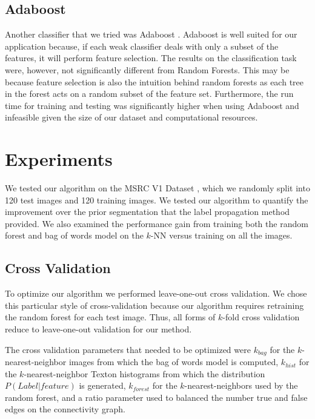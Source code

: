 \documentclass{article} %
\begin{document}
\subsection{Adaboost}
Another classifier that we tried was Adaboost \cite{Freund96experimentswith}. Adaboost is well suited for our application because, if each weak classifier deals with only a subset of the features, it will perform feature selection. The results on the classification task were, however, not significantly different from Random Forests. This may be because feature selection is also the intuition behind random forests as each tree in the forest acts on a random subset of the feature set. Furthermore, the run time for training and testing was significantly higher when using Adaboost and infeasible given the size of our dataset and computational resources.


\section{Experiments}
\label{sec:Exp}

We tested our algorithm on the MSRC V1 Dataset \cite{MSRC}, which we randomly split into 120 test images and 120 training images.
We tested our algorithm to quantify the improvement over the prior segmentation that the label propagation method provided. We also examined the performance gain from training both the random forest and bag of words model on the $k$-NN versus training on all the images.

\subsection{Cross Validation}
\label{sec:cross}

To optimize our algorithm we performed leave-one-out cross validation. We chose this particular style of cross-validation because our algorithm requires retraining the random forest for each test image. Thus, all forms of $k$-fold cross validation reduce to leave-one-out validation for our method.

The cross validation parameters that needed to be optimized were $k_{bag}$ for the $k$-nearest-neighbor images from which the bag of words model is computed, $k_{hist}$ for the $k$-nearest-neighbor Texton histograms from which the distribution $P(Label | feature)$ is generated, $k_{forest}$ for the $k$-nearest-neighbors used by the random forest, and a ratio parameter used to balanced the number true and false edges on the connectivity graph. 
\end{document}
